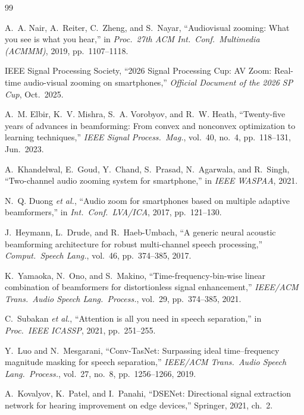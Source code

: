 \documentclass[journal,10pt]{IEEEtran}
\begin{document}
\balance
\begin{thebibliography}{99}

 A.~A. Nair, A.~Reiter, C.~Zheng, and S.~Nayar, ``Audiovisual zooming: What you see is what you hear,'' in \emph{Proc.\ 27th ACM Int.\ Conf.\ Multimedia (ACMMM)}, 2019, pp.~1107--1118.

 IEEE Signal Processing Society, ``2026 Signal Processing Cup: AV Zoom: Real-time audio-visual zooming on smartphones,'' \emph{Official Document of the 2026 SP Cup}, Oct.\ 2025.

 A.~M. Elbir, K.~V. Mishra, S.~A. Vorobyov, and R.~W. Heath, ``Twenty-five years of advances in beamforming: From convex and nonconvex optimization to learning techniques,'' \emph{IEEE Signal Process.\ Mag.}, vol.~40, no.~4, pp.~118--131, Jun.\ 2023.

 A.~Khandelwal, E.~Goud, Y.~Chand, S.~Prasad, N.~Agarwala, and R.~Singh, ``Two-channel audio zooming system for smartphone,'' in \emph{IEEE WASPAA}, 2021.

 N.~Q. Duong \emph{et al.}, ``Audio zoom for smartphones based on multiple adaptive beamformers,'' in \emph{Int.\ Conf.\ LVA/ICA}, 2017, pp.~121--130.

 J.~Heymann, L.~Drude, and R.~Haeb-Umbach, ``A generic neural acoustic beamforming architecture for robust multi-channel speech processing,'' \emph{Comput.\ Speech Lang.}, vol.~46, pp.~374--385, 2017.

 K.~Yamaoka, N.~Ono, and S.~Makino, ``Time-frequency-bin-wise linear combination of beamformers for distortionless signal enhancement,'' \emph{IEEE/ACM Trans.\ Audio Speech Lang.\ Process.}, vol.~29, pp.~374--385, 2021.

 C.~Subakan \emph{et al.}, ``Attention is all you need in speech separation,'' in \emph{Proc.\ IEEE ICASSP}, 2021, pp.~251--255.

 Y.~Luo and N.~Mesgarani, ``Conv-TasNet: Surpassing ideal time--frequency magnitude masking for speech separation,'' \emph{IEEE/ACM Trans.\ Audio Speech Lang.\ Process.}, vol.~27, no.~8, pp.~1256--1266, 2019.

 A.~Kovalyov, K.~Patel, and I.~Panahi, ``DSENet: Directional signal extraction network for hearing improvement on edge devices,'' Springer, 2021, ch.~2.


\end{thebibliography}
\end{document}
